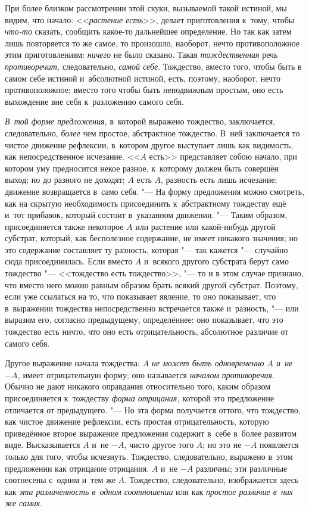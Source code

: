 При более близком рассмотрении этой скуки, вызываемой такой истиной, мы
видим, что начало: <<{\em растение есть}>>, делает
приготовления к~тому, чтобы {\em что-то} сказать,
сообщить какое-то дальнейшее определение. Но так как затем лишь повторяется
то же самое, то произошло, наоборот, нечто противоположное этим
приготовлениям: {\em ничего} не было сказано. Такая
{\em тождественная} речь {\em противоречит,} следовательно,
{\em самой себе}. Тождество, вместо того, чтобы быть в
самом себе истиной и~абсолютной истиной, есть, поэтому, наоборот, нечто
противоположное; вместо того чтобы быть неподвижным простым, оно есть
выхождение вне себя к~разложению самого себя.

{\em В~той форме предложения,} в~которой выражено
тождество, заключается, следовательно, {\em более} чем
простое, абстрактное тождество. В~ней заключается то чистое движение
рефлексии, в~котором другое выступает лишь как видимость, как
непосредственное исчезание. <<$A$ есть>> представляет собою начало,
при котором уму предносится некое разное, к~которому должен быть совершён
выход; но до разного не доходят; $A$ есть $A$, разность есть
лишь исчезание; движение возвращается в~само себя. "--- На форму предложения
можно смотреть, как на скрытую необходимость присоединить к~абстрактному
тождеству ещё и~тот прибавок, который состоит в~указанном движении. "--- Таким
образом, присоединяется также некоторое $A$ или растение или
какой-нибудь другой субстрат, который, как бесполезное содержание, не имеет
никакого значения; но это содержание составляет ту разность, которая "--- так
кажется "--- случайно сюда присоединилась. Если вместо $A$ и~всякого другого
субстрата берут само тождество "--- <<тождество есть тождество>>, "--- то и
в этом случае признано, что вместо него можно равным образом брать всякий
другой субстрат. Поэтому, если уже ссылаться на то, что показывает явление,
то оно показывает, что в~выражении тождества непосредственно встречается
также и~разность, "--- или выразим его, согласно предыдущему, определённее:
оно показывает, что это тождество есть ничто, что оно есть отрицательность,
абсолютное различие от самого себя.

Другое выражение начала тождества: {\em $A$ не может быть
одновременно $A$ и~не $-A$,} имеет отрицательную форму; оно называется
{\em началом противоречия}. Обычно не дают никакого
оправдания относительно того, каким образом присоединяется к~тождеству
{\em форма отрицания,} которой это предложение
отличается от предыдущего. "--- Но эта форма получается оттого, что тождество,
как чистое движение рефлексии, есть простая отрицательность, которую
приведённое второе выражение предложения содержит в~себе в~более развитом
виде. Высказывается $A$ и~не $-A$, чисто другое того
$A$; но это не $-A$ появляется только для того, чтобы
исчезнуть. Тождество, следовательно, выражено в~этом предложении как
отрицание отрицания. $A$ и~не $-A$ различны; эти различные
соотнесены с~одним и~тем же $A$. Тождество, следовательно,
изображается здесь как {\em эта различенность в~одном
соотношении} или как {\em простое различие в~них же
самих}.

